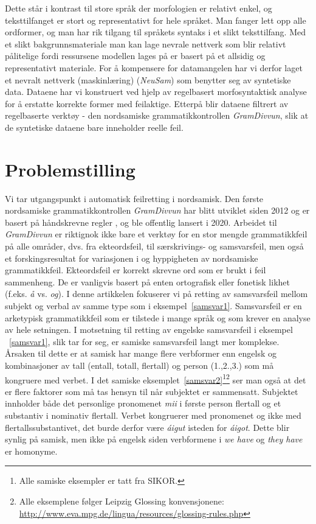 \documentclass{flammie}
\begin{document}
Dette står i kontrast til store språk der morfologien er relativt enkel, og
teksttilfanget er stort og representativt for hele språket.  Man fanger lett opp
alle ordformer, og man har rik tilgang til språkets syntaks i et slikt
teksttilfang.  Med et slikt bakgrunnsmateriale man kan lage nevrale nettverk som
blir relativt pålitelige fordi ressursene modellen lages på er basert på et
allsidig og representativt materiale.  For å kompensere for datamangelen har vi
derfor laget et nevralt nettverk (maskinlæring) (\textit{NeuSam}) som benytter
seg av syntetiske data. Dataene har vi konstruert ved hjelp av regelbasert
morfosyntaktisk analyse for å erstatte korrekte former med feilaktige. Etterpå
blir dataene filtrert av regelbaserte verktøy - den nordsamiske
grammatikkontrollen \textit{GramDivvun}, slik at de syntetiske dataene bare
inneholder reelle feil.

\section{Problemstilling}

Vi tar utgangspunkt i automatisk feilretting i nordsamisk.  Den første
nordsamiske grammatikkontrollen \textit{GramDivvun} har blitt utviklet siden
2012 og er basert på håndskrevne regler \cite{Wiechetek2012}, og ble offentlig
lansert i 2020.  Arbeidet til \textit{GramDivvun} er riktignok ikke bare et
verktøy for en stor mengde grammatikkfeil på alle områder, dvs. fra
ekteordsfeil, til særskrivings- og samsvarsfeil, men også et forskingsresultat
for variasjonen i og hyppigheten av nordsamiske grammatikkfeil.  Ekteordsfeil er
korrekt skrevne ord som er brukt i feil sammenheng. De er vanligvis basert på
enten ortografisk eller fonetisk likhet (f.eks. \textit{å} vs. \textit{og}).  I
denne artikkelen fokuserer vi på retting av samsvarsfeil mellom subjekt og
verbal av samme type som i eksempel~\ref{samsvar1}.  Samsvarsfeil er en
arketypisk grammatikkfeil som er tilstede i mange språk og som krever en analyse
av hele setningen.  I motsetning til retting av engelske samsvarsfeil i eksempel
~\ref{samsvar1}, slik \cite{ng-etal-2013-conll} tar for seg, er samiske
samsvarsfeil langt mer komplekse.  Årsaken til dette er at samisk har mange
flere verbformer enn engelsk og kombinasjoner av tall (entall, totall, flertall)
og person (1.,2.,3.) som må kongruere med verbet. I det samiske
eksemplet~\ref{samsvar2}\footnote{Alle samiske eksempler er tatt fra
SIKOR.}\footnote{Alle eksemplene følger Leipzig Glossing konvensjonene:
\url{http://www.eva.mpg.de/lingua/resources/glossing-rules.php}} ser man også at
det er flere faktorer som må tas hensyn til når subjektet er sammensatt.
Subjektet innholder både det personlige pronomenet \textit{mii} i første person
flertall og et substantiv i nominativ flertall.  Verbet kongruerer med
pronomenet og ikke med flertallssubstantivet, det burde derfor være
\textit{áigut} isteden for \textit{áigot}. Dette blir synlig på samisk, men ikke
på engelsk siden verbformene i \textit{we have} og \textit{they have} er
homonyme.
\end{document}
